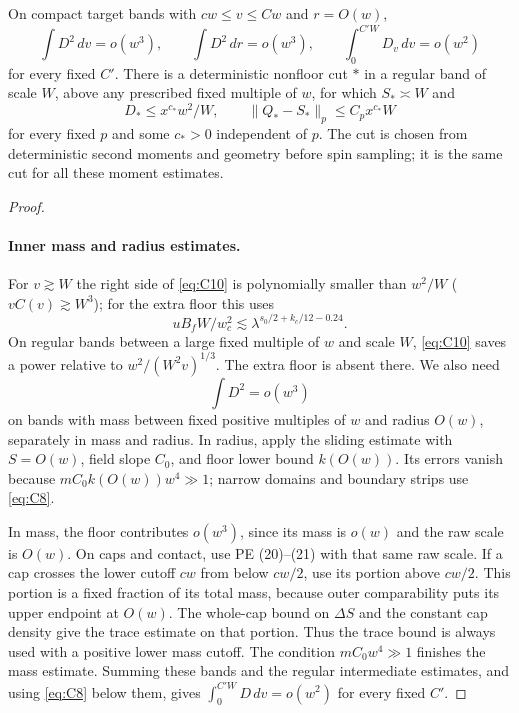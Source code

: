 \begin{lemma}\label{bud:common-star}
On compact target bands with $cw\le v\le Cw$ and $r=O(w)$,
\[
 \int D^2\,dv=o(w^3),\qquad \int D^2\,dr=o(w^3),
 \qquad \int_0^{C'W}D_v\,dv=o(w^2)
\]
for every fixed $C'$. There is a deterministic nonfloor cut $*$ in a
regular band of scale $W$, above any prescribed fixed multiple of $w$,
for which $S_*\asymp W$ and
\[
 D_*\le x^{c_*}w^2/W,\qquad
 \|Q_*-S_*\|_p\le C_p x^{c_*}W
\]
for every fixed $p$ and some $c_*>0$ independent of $p$.
The cut is chosen from deterministic second moments and geometry before
spin sampling; it is the same cut for all these moment estimates.
\end{lemma}
\begin{proof}
\leavevmode\par
\paragraph{Inner mass and radius estimates.}

For \(v\gtrsim W\) the right side of \eqref{eq:C10} is polynomially smaller than \(w^2/W\) (\(v C(v)\gtrsim W^3\)); for the extra floor this uses
\[
 u B_f W/w_c^2\lesssim\lambda^{s_0/2+k_c/12-0.24}.
\]
On regular bands between a large fixed multiple of \(w\) and scale
\(W\), \eqref{eq:C10} saves a power relative to
\(w^2/(W^2v)^{1/3}\). The extra floor is absent there.
We also need
\[
 \int D^2=o(w^3)
\]
on bands with mass between fixed positive multiples of \(w\) and
radius \(O(w)\), separately in mass and radius. In radius, apply the
sliding estimate with \(S=O(w)\), field slope \(C_0\), and floor
lower bound \(k(O(w))\). Its errors vanish because
\(mC_0k(O(w))w^4\gg1\); narrow domains and boundary strips use
\eqref{eq:C8}.

In mass, the floor contributes \(o(w^3)\), since its mass is \(o(w)\)
and the raw scale is \(O(w)\). On caps and contact, use PE (20)--(21)
with that same raw scale. If a cap crosses the lower cutoff \(cw\)
from below \(cw/2\), use its portion above \(cw/2\). This portion
is a fixed fraction of its total mass, because outer comparability
puts its upper endpoint at \(O(w)\). The whole-cap bound on
\(\Delta S\) and the constant cap density give the trace estimate
on that portion. Thus the trace bound is always used with a positive
lower mass cutoff. The condition \(mC_0w^4\gg1\) finishes the
mass estimate. Summing these bands and the regular intermediate
estimates, and using \eqref{eq:C8} below them, gives
\(\int_0^{C'W}D\,dv=o(w^2)\) for every fixed \(C'\).



\end{proof}
